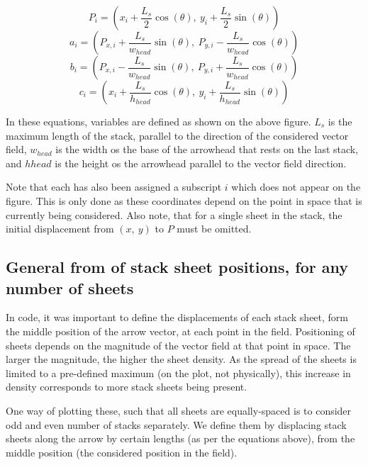 \documentclass[11]{report}
\begin{document}
\[ P_i = \left( x_i + \frac{L_s}{2} \cos( \theta) , \  y_i + \frac{L_s}{2} \sin( \theta) \right) \]
\[ a_i = \left( P_{x, i} + \frac{L_s}{w_{head}} \sin( \theta) , \  P_{y, i} - \frac{L_s}{w_{head}} \cos( \theta) \right) \]
\[ b_i = \left( P_{x, i} - \frac{L_s}{w_{head}} \sin( \theta) , \  P_{y, i} + \frac{L_s}{w_{head}} \cos( \theta) \right) \]
\[ c_i = \left( x_i + \frac{L_s}{h_{head}} \cos( \theta) , \  y_i + \frac{L_s}{h_{head}} \sin( \theta) \right) \]

In these equations, variables are defined as shown on the above figure. \( L_s \) is the maximum length of the stack, parallel to the direction of the considered vector field, \( w_{head} \) is the width os the base of the arrowhead that rests on the last stack, and \( h{head} \) is the height os the arrowhead parallel to the vector field direction.

Note that each has also been assigned a subscript \( i \) which does not appear on the figure. This is only done as these coordinates depend on the point in space that is currently being considered. Also note, that for a single sheet in the stack, the initial displacement from \( (x, \ y )\) to \( P \) must be omitted.

\subsection{General from of stack sheet positions, for any number of sheets}

In code, it was important to define the displacements of each stack sheet, form the middle position of the arrow vector, at each point in the field. Positioning of sheets depends on the magnitude of the vector field at that point in space. The larger the magnitude, the higher the sheet density. As the spread of the sheets is limited to a pre-defined maximum (on the plot, not physically), this increase in density corresponds to more stack sheets being present.

One way of plotting these, such that all sheets are equally-spaced is to consider odd and even number of stacks separately. We define them by displacing stack sheets along the arrow by certain lengths (as per the equations above), from the middle position (the considered position in the field).
\end{document}
